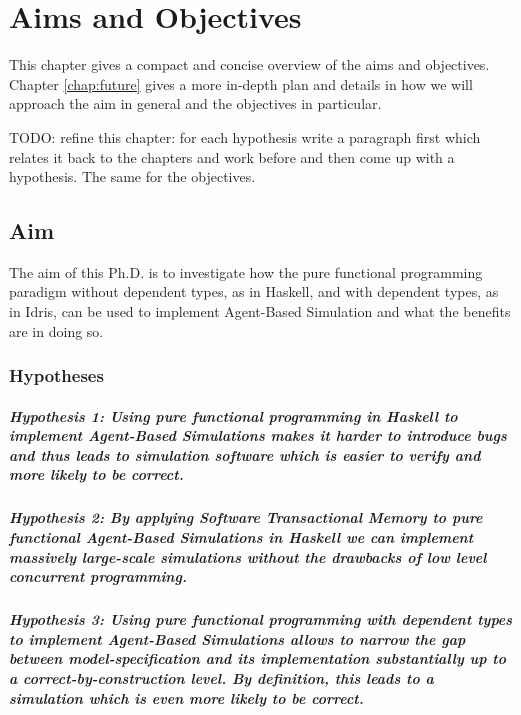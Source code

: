 \chapter{Aims and Objectives}
\label{chap:aimsObj}

This chapter gives a compact and concise overview of the aims and objectives. Chapter \ref{chap:future} gives a more in-depth plan and details in how we will approach the aim in general and the objectives in particular.

TODO: refine this chapter: for each hypothesis write a paragraph first which relates it back to the chapters and work before and then come up with a hypothesis. The same for the objectives.

\section{Aim}
The aim of this Ph.D. is to investigate how the pure functional programming paradigm without dependent types, as in Haskell, and with dependent types, as in Idris, can be used to implement Agent-Based Simulation and what the benefits are in doing so.

\subsection{Hypotheses}
\paragraph{Hypothesis 1: Using pure functional programming in Haskell to implement Agent-Based Simulations makes it harder to introduce bugs and thus leads to simulation software which is easier to verify and more likely to be correct.}

\paragraph{Hypothesis 2: By applying Software Transactional Memory to pure functional Agent-Based Simulations in Haskell we can implement massively large-scale simulations without the drawbacks of low level concurrent programming.}

\paragraph{Hypothesis 3: Using pure functional programming with dependent types to implement Agent-Based Simulations allows to narrow the gap between model-specification and its implementation substantially up to a correct-by-construction level. By definition, this leads to a simulation which is even more likely to be correct.}


